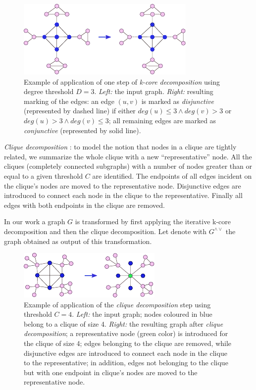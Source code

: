 \documentclass[review]{elsarticle}
\begin{document}
\begin{figure}
\centering
\includegraphics[width=.9\textwidth]{k_core}
\caption{Example of application of one step of \textit{k-core decomposition} using degree threshold $D = 3$. {\it Left:} the input graph. \textit{Right:} resulting marking of the edges: an edge $(u,v)$ is marked as {\it disjunctive} (represented by dashed line) if either $ deg(u) \leq 3 \wedge  deg(v) > 3 $ or $ deg(u) > 3 \wedge  deg(v) \leq 3 $; all remaining edges are marked as {\it conjunctive} (represented by solid line).}
\label{fig:kcore-decomposition}
\end{figure}

\textit{Clique decomposition} \cite{tarjan1985decomposition}: to model the notion that nodes in a clique are tightly related, we summarize the whole clique with a new ``representative'' node. All the cliques (completely connected subgraphs) with a number of nodes greater than or equal to a given threshold  $C$ are identified. The endpoints of all edges incident on the clique's nodes are moved to the representative node. Disjunctive edges are introduced to connect each node in the clique to the representative. Finally all edges with both endpoints in the clique are removed.

In our work a graph $G$ is transformed by  first applying the iterative k-core decomposition and then the clique decomposition. Let denote with $G^{\wedge\vee}$ the graph obtained as output of this transformation.

\begin{figure}
\centering
\includegraphics[width=.9\textwidth]{cliques.pdf}
\caption{Example of application of the {\it clique decomposition} step using threshold $C = 4$. {\it Left:} the input graph; nodes coloured in blue belong to a clique of size 4. \textit{Right:} the resulting graph after {\it clique decomposition}; a representative node (green color) is introduced for the clique of size 4; edges belonging to the clique are removed, while disjunctive edges are introduced to connect each node in the clique to the representative; in addition, edges not belonging to the clique but with one endpoint in clique's nodes  are moved  to the representative node. }
\label{fig:clique-decomposition}
\end{figure}
\end{document}
